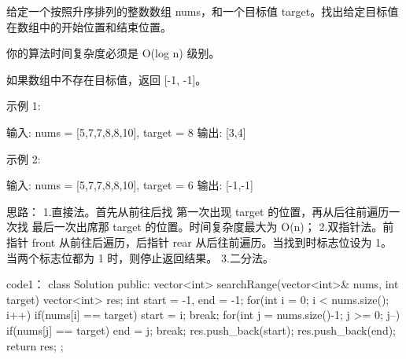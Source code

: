 给定一个按照升序排列的整数数组 nums，和一个目标值 target。找出给定目标值在数组中的开始位置和结束位置。

你的算法时间复杂度必须是 O(log n) 级别。

如果数组中不存在目标值，返回 [-1, -1]。

示例 1:

输入: nums = [5,7,7,8,8,10], target = 8
输出: [3,4]

示例 2:

输入: nums = [5,7,7,8,8,10], target = 6
输出: [-1,-1]


























思路：
1.直接法。首先从前往后找 第一次出现 target 的位置，再从后往前遍历一次找 最后一次出席那 target 的位置。时间复杂度最大为 O(n)；
2.双指针法。前指针 front 从前往后遍历，后指针 rear 从后往前遍历。当找到时标志位设为 1。当两个标志位都为 1 时，则停止返回结果。
3.二分法。





























code1：
class Solution {
public:
    vector<int> searchRange(vector<int>& nums, int target) {
        vector<int> res;
        int start = -1, end = -1;
        for(int i = 0; i < nums.size(); i++)
        {
            if(nums[i] == target)
            {
                start = i; break;
            }
        }
        for(int j = nums.size()-1; j >= 0; j--)
        {
            if(nums[j] == target)
            {
                end = j; break;
            }
        }
        res.push_back(start);
        res.push_back(end);
        return res;
    }
};



